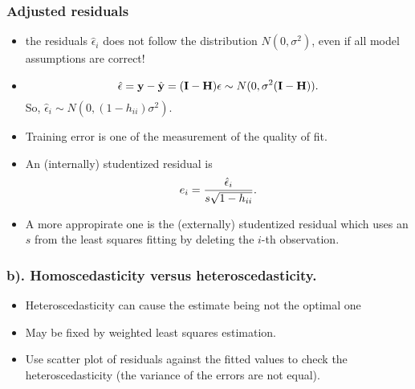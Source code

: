\documentclass{beamer}
\def\bfy{{\bf y}}
\begin{document}
      
      \begin{frame}
      	\frametitle{Adjusted residuals}
      	\begin{itemize}
      		
      		\item  the residuals $\hat \epsilon_i$ does not
      		follow the distribution $N(0, \sigma^2)$, even if all model assumptions are correct!
      		
      		\item $$ \hat {\bf \epsilon} = \bfy - \hat \bfy = ({\bf I}-{\bf H}) {\bf \epsilon}
      		\sim N(0, \sigma^2 ({\bf I}-{\bf H})).$$
      		So, $\hat \epsilon_i \sim N(0, (1- h_{ii})\sigma^2)$. 
      		
      		\item  Training error is one of the measurement of the quality of fit.
      		
      		\item  An (internally) studentized residual is
      		$$e_i = {\hat \epsilon_i \over s \sqrt{1- h_{ii}}}.$$
      		
      		\item A more appropirate one is
      		the (externally) studentized residual which uses an $s$ from the least squares fitting
      		by deleting the $i$-th observation.	
      		
      	\end{itemize}
      \end{frame}
      
      \begin{frame}
      	\frametitle{b). Homoscedasticity versus heteroscedasticity.   }
      	\begin{itemize}
      		
      		\item  Heteroscedasticity can cause
      		the estimate being not the optimal one
      		
      		\item May be fixed by weighted least squares
      		estimation. 
      		
      		\item Use scatter plot of residuals against the fitted values
      		to check the heteroscedasticity (the variance of the errors are not equal).
      		
      	\end{itemize}
      \end{frame}
      
      
      
\end{document}
